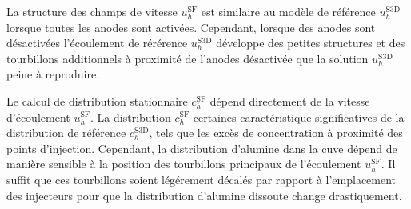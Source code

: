 La structure des champs de vitesse $u_h^\mathrm{SF}$ est
similaire au modèle de référence $u_h^\mathrm{S3D}$ lorsque
toutes les anodes sont activées. Cependant, lorsque des anodes sont
désactivées l'écoulement de rérérence $u_h^\mathrm{S3D}$ développe des
petites structures et des tourbillons additionnels à proximité de
l'anodes désactivée que la solution $u_h^\mathrm{S3D}$ peine à
reproduire.

Le calcul de distribution stationnaire $c_h^\mathrm{SF}$ dépend
directement de la vitesse d'écoulement $u_h^\mathrm{SF}$. La
distribution $c_h^\mathrm{SF}$ certaines caractéristique
significatives de la distribution de référence $c_h^\mathrm{S3D}$,
tels que les excès de concentration à proximité des points
d'injection. Cependant, la distribution d'alumine dans la cuve
dépend de manière sensible à la position des tourbillons principaux
de l'écoulement $u_h^\mathrm{SF}$. Il suffit que ces tourbillons
soient légérement décalés par rapport à l'emplacement des injecteurs
pour que la distribution d'alumine dissoute change drastiquement.
